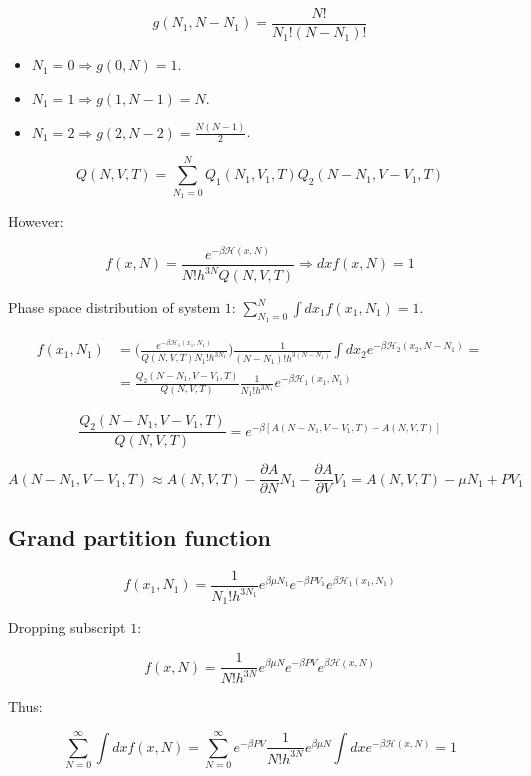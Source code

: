 $$g(N_1, N-N_1) = \frac{N!}{N_1!(N-N_1)!}$$

\begin{multicols}{3}
	\begin{itemize}
		\item $N_1 = 0\Rightarrow g(0, N) = 1$.
		\item $N_1 = 1\Rightarrow g(1, N-1) = N$.
		\item $N_1 = 2\Rightarrow g(2, N-2) = \frac{N(N-1)}{2}$.
	\end{itemize}
\end{multicols}

$$Q(N, V, T) = \sum\limits_{N_1=0}^NQ_1(N_1, V_1, T)Q_2(N-N_1, V-V_1, T)$$

However:

$$f(x, N) = \frac{e^{-\beta\mathcal{H}(x, N)}}{N!h^{3N}Q(N, V, T)}\Rightarrow dxf(x, N) = 1$$

Phase space distribution of system $1$: $\sum\limits_{N_1=0}^{N}\int dx_1f(x_1, N_1) = 1$.

\begin{align*}
	f(x_1, N_1) &=\biggl(\frac{e^{-\beta\mathcal{H}_1(x_1, N_1)}}{Q(N, V, T)N_1!h^{3N_1}}\biggr)\frac{1}{(N-N_1)!h^{3(N-N_1)}}\int dx_2e^{-\beta\mathcal{H}_2(x_2, N-N_1)} = \\
							&= \frac{Q_2(N-N_1, V-V_1, T)}{Q(N, V, T)}\frac{1}{N_1!h^{3N_1}}e^{-\beta\mathcal{H}_1(x_1, N_1)}
\end{align*}

$$\frac{Q_2(N-N_1, V-V_1, T)}{Q(N, V, T)} = e^{-\beta[A(N-N_1, V-V_1, T) - A(N, V, T)]}$$

$$A(N-N_1, V-V_1, T)\approx A(N, V, T) -\frac{\partial A}{\partial N}N_1-\frac{\partial A}{\partial V}V_1 = A(N, V, T)-\mu N_1 + PV_1$$


	\subsection{Grand partition function}

	$$f(x_1, N_1) = \frac{1}{N_1!h^{3N_1}}e^{\beta\mu N_1}e^{-\beta PV_1}e^{\beta\mathcal{H}_1(x_1, N_1)}$$

	Dropping subscript $1$:

	$$f(x, N) = \frac{1}{N!h^{3N}}e^{\beta\mu N}e^{-\beta PV}e^{\beta\mathcal{H}(x, N)}$$

	Thus:

	$$\sum\limits_{N=0}^{\infty}\int dxf(x, N) = \sum\limits_{N=0}^{\infty}e^{-\beta PV}\frac{1}{N!h^{3N}}e^{\beta\mu N}\int dxe^{-\beta\mathcal{H}(x, N)} = 1$$

